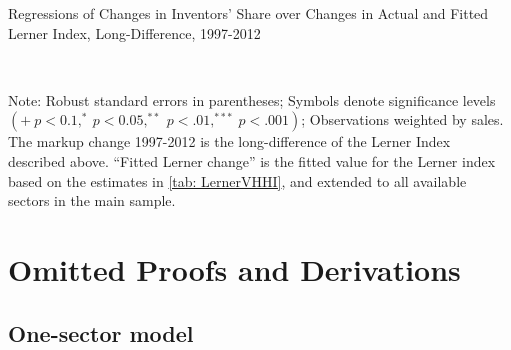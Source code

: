 \begin{table}[h]
\caption{Regressions of Changes in Inventors' Share over Changes in Actual
and Fitted Lerner Index, Long-Difference, 1997-2012\label{tab: MainWLerner}}

\begin{centering}
\\
\par\end{centering}
\raggedright{}{\small{}Note: Robust standard errors in parentheses;
Symbols denote significance levels $\left(+\ p<0.1,^{*}\ p<0.05,^{**}\ p<.01,^{***}\ p<.001\right)$;
Observations weighted by sales. The markup change 1997-2012 is the
long-difference of the Lerner Index described above. ``Fitted Lerner
change'' is the fitted value for the Lerner index based on the estimates
in \ref{tab: LernerVHHI}, and extended to all available sectors in
the main sample. }{\small\par}
\end{table}
\FloatBarrier

\section{Omitted Proofs and Derivations\label{app: Omitted-Proofs}}

\subsection{One-sector model}


